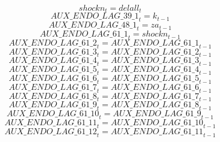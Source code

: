 \begin{dmath}
{shockn}_{t}={delall}_{t}
\end{dmath}
\begin{dmath}
{AUX\_ENDO\_LAG\_39\_1}_{t}={k}_{t-1}
\end{dmath}
\begin{dmath}
{AUX\_ENDO\_LAG\_48\_1}_{t}={za}_{t-1}
\end{dmath}
\begin{dmath}
{AUX\_ENDO\_LAG\_61\_1}_{t}={shockn}_{t-1}
\end{dmath}
\begin{dmath}
{AUX\_ENDO\_LAG\_61\_2}_{t}={AUX\_ENDO\_LAG\_61\_1}_{t-1}
\end{dmath}
\begin{dmath}
{AUX\_ENDO\_LAG\_61\_3}_{t}={AUX\_ENDO\_LAG\_61\_2}_{t-1}
\end{dmath}
\begin{dmath}
{AUX\_ENDO\_LAG\_61\_4}_{t}={AUX\_ENDO\_LAG\_61\_3}_{t-1}
\end{dmath}
\begin{dmath}
{AUX\_ENDO\_LAG\_61\_5}_{t}={AUX\_ENDO\_LAG\_61\_4}_{t-1}
\end{dmath}
\begin{dmath}
{AUX\_ENDO\_LAG\_61\_6}_{t}={AUX\_ENDO\_LAG\_61\_5}_{t-1}
\end{dmath}
\begin{dmath}
{AUX\_ENDO\_LAG\_61\_7}_{t}={AUX\_ENDO\_LAG\_61\_6}_{t-1}
\end{dmath}
\begin{dmath}
{AUX\_ENDO\_LAG\_61\_8}_{t}={AUX\_ENDO\_LAG\_61\_7}_{t-1}
\end{dmath}
\begin{dmath}
{AUX\_ENDO\_LAG\_61\_9}_{t}={AUX\_ENDO\_LAG\_61\_8}_{t-1}
\end{dmath}
\begin{dmath}
{AUX\_ENDO\_LAG\_61\_10}_{t}={AUX\_ENDO\_LAG\_61\_9}_{t-1}
\end{dmath}
\begin{dmath}
{AUX\_ENDO\_LAG\_61\_11}_{t}={AUX\_ENDO\_LAG\_61\_10}_{t-1}
\end{dmath}
\begin{dmath}
{AUX\_ENDO\_LAG\_61\_12}_{t}={AUX\_ENDO\_LAG\_61\_11}_{t-1}
\end{dmath}
